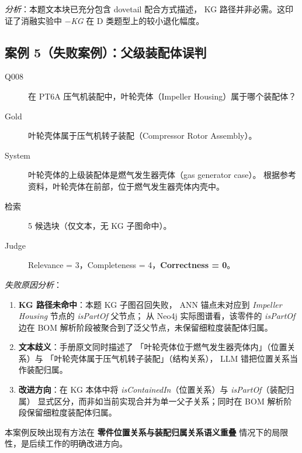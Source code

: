 \textit{分析}：本题文本块已充分包含 dovetail 配合方式描述，
KG 路径并非必需。这印证了消融实验中 \textit{$-$KG} 在 D 类题型上的较小退化幅度。

\subsection{案例 5（失败案例）：父级装配体误判}

\begin{description}
  \item[\textnormal{Q008}] 在 PT6A 压气机装配中，叶轮壳体（Impeller Housing）属于哪个装配体？
  \item[\textnormal{Gold}] 叶轮壳体属于压气机转子装配（Compressor Rotor Assembly）。
  \item[\textnormal{System}] 叶轮壳体的上级装配体是燃气发生器壳体（gas generator case）。
        根据参考资料，叶轮壳体在前部，位于燃气发生器壳体内壳中。
  \item[\textnormal{检索}] 5 候选块（仅文本，无 KG 子图命中）。
  \item[\textnormal{Judge}] Relevance = 3，Completeness = 4，\textbf{Correctness = 0}。
\end{description}

\textit{失败原因分析}：
\begin{enumerate}
  \item \textbf{KG 路径未命中}：本题 KG 子图召回失败，
        ANN 锚点未对应到 \textit{Impeller Housing} 节点的 \textit{isPartOf} 父节点；
        从 Neo4j 实际图谱看，该零件的 \textit{isPartOf} 边在
        BOM 解析阶段被聚合到了泛父节点，未保留细粒度装配体归属。
  \item \textbf{文本歧义}：手册原文同时描述了
        「叶轮壳体位于燃气发生器壳体内」（位置关系）与
        「叶轮壳体属于压气机转子装配」（结构关系），
        LLM 错把位置关系当作装配归属。
  \item \textbf{改进方向}：在 KG 本体中将
        \textit{isContainedIn}（位置关系）与 \textit{isPartOf}（装配归属）
        显式区分，而非如当前实现合并为单一父子关系；同时在 BOM
        解析阶段保留细粒度装配体归属。
\end{enumerate}

本案例反映出现有方法在 \textbf{零件位置关系与装配归属关系语义重叠}
情况下的局限性，是后续工作的明确改进方向。
